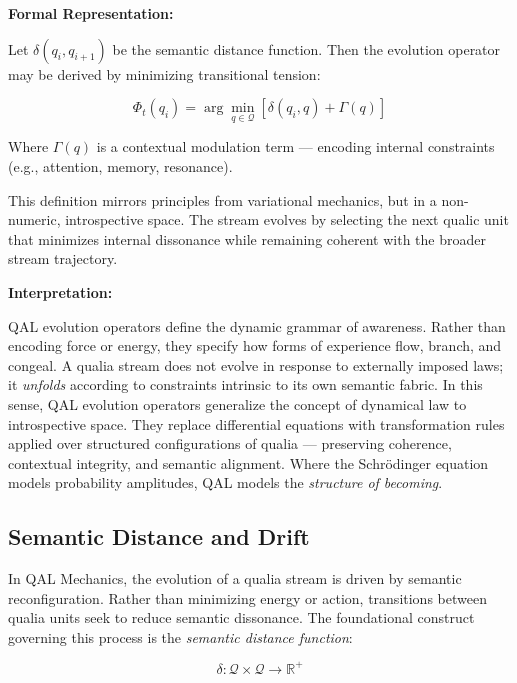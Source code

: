\documentclass[11pt]{article}
\numberwithin{equation}{section} %
\begin{document}
\bigskip

\noindent\textbf{Formal Representation:}

Let \( \delta(q_i, q_{i+1}) \) be the semantic distance function. Then the evolution operator may be derived by minimizing transitional tension:

\begin{equation}
\Phi_t(q_i) = \arg\min_{q \in \mathcal{Q}} \left[ \delta(q_i, q) + \Gamma(q) \right]
\end{equation}

\noindent Where \( \Gamma(q) \) is a contextual modulation term — encoding internal constraints (e.g., attention, memory, resonance).

This definition mirrors principles from variational mechanics, but in a non-numeric, introspective space. The stream evolves by selecting the next qualic unit that minimizes internal dissonance while remaining coherent with the broader stream trajectory.

\bigskip

\noindent\textbf{Interpretation:}

QAL evolution operators define the dynamic grammar of awareness. Rather than encoding force or energy, they specify how forms of experience flow, branch, and congeal. A qualia stream does not evolve in response to externally imposed laws; it \textit{unfolds} according to constraints intrinsic to its own semantic fabric. In this sense, QAL evolution operators generalize the concept of dynamical law to introspective space. They replace differential equations with transformation rules applied over structured configurations of qualia — preserving coherence, contextual integrity, and semantic alignment. Where the Schrödinger equation models probability amplitudes, QAL models the \textit{structure of becoming}.

\subsection{Semantic Distance and Drift}

In QAL Mechanics, the evolution of a qualia stream is driven by semantic reconfiguration. Rather than minimizing energy or action, transitions between qualia units seek to reduce semantic dissonance. The foundational construct governing this process is the \textit{semantic distance function}:

\begin{equation}
\delta: \mathcal{Q} \times \mathcal{Q} \rightarrow \mathbb{R}^{+}
\end{equation}
\end{document}
